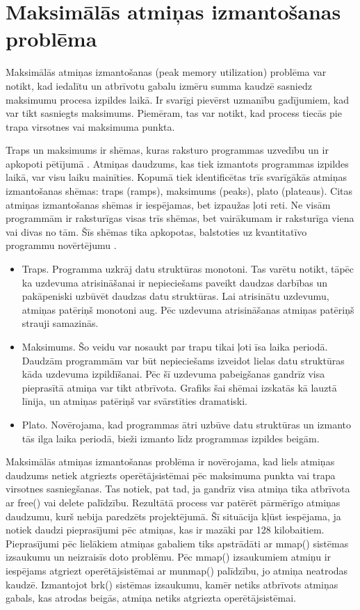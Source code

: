 \section{Maksimālās atmiņas izmantošanas problēma}
 \label{sec:peak_mem}
 Maksimālās atmiņas izmantošanas (peak memory utilization) problēma var notikt, kad iedalītu un atbrīvotu gabalu izmēru summa kaudzē sasniedz maksimumu procesa izpildes laikā.
Ir svarīgi pievērst uzmanību gadījumiem, kad var tikt sasniegts maksimums.
Piemēram, tas var notikt, kad process tiecās pie trapa virsotnes vai maksimuma punkta.

Traps un maksimums ir shēmas, kuras raksturo programmas uzvedību un ir apkopoti pētījumā \cite{PWMS}. Atmiņas daudzums, kas tiek izmantots programmas izpildes laikā, var visu laiku mainīties.
Kopumā tiek identificētas trīs svarīgākās atmiņas izmantošanas shēmas: traps (ramps),  maksimums (peaks),  plato (plateaus).
Citas atmiņas izmantošanas shēmas ir iespējamas, bet izpaužas ļoti reti.
Ne visām programmām ir raksturīgas visas trīs shēmas, bet vairākumam ir raksturīga viena vai divas no tām.
Šīs shēmas tika apkopotas, balstoties uz kvantitatīvo programmu novērtējumu \cite{PWMS}. 
\begin{itemize}
\item Traps. Programma uzkrāj datu struktūras monotoni. 
Tas varētu notikt, tāpēc ka uzdevuma atrisināšanai ir nepieciešams paveikt daudzas darbības un pakāpeniski uzbūvēt daudzas  datu struktūras. 
Lai atrisinātu uzdevumu, atmiņas patēriņš monotoni aug. Pēc uzdevuma atrisināšanas atmiņas patēriņš strauji samazinās.
\item Maksimums. Šo veidu var nosaukt par trapu tikai ļoti īsa laika periodā.
Daudzām programmām var būt nepieciešams izveidot lielas datu struktūras kāda uzdevuma izpildīšanai.
Pēc šī uzdevuma pabeigšanas gandrīz visa pieprasītā atmiņa var tikt atbrīvota.
Grafiks šai shēmai izskatās kā lauztā līnija, un atmiņas patēriņš var svārstīties dramatiski.
\item Plato. Novērojama, kad programmas ātri uzbūve datu struktūras un izmanto tās ilga laika periodā, bieži izmanto līdz programmas izpildes beigām.
\end{itemize}


Maksimālās atmiņas izmantošanas problēma ir novērojama, kad liels atmiņas daudzums netiek atgriezts operētājsistēmai pēc maksimuma punkta vai trapa virsotnes sasniegšanas.
Tas notiek, pat tad, ja gandrīz visa atmiņa tika atbrīvota ar free() vai delete palīdzību.
Rezultātā process var patērēt pārmērīgo atmiņas daudzumu, kurš nebija paredzēts projektējumā.
Šī situācija kļūst iespējama, ja notiek daudzi pieprasījumi pēc atmiņas, kas ir mazāki par 128 kilobaitiem.
Pieprasījumi pēc lielākiem atmiņas gabaliem tiks apstrādāti ar mmap() sistēmas izsaukumu un neizraisīs doto problēmu.
Pēc mmap() izsaukumiem atmiņu ir iespējams atgriezt operētājsistēmai ar munmap() palīdzību, jo atmiņa neatrodas kaudzē. 
Izmantojot brk() sistēmas izsaukumu, kamēr netiks atbrīvots atmiņas gabals, kas atrodas beigās, atmiņa netiks atgriezta operētājsistēmai.

